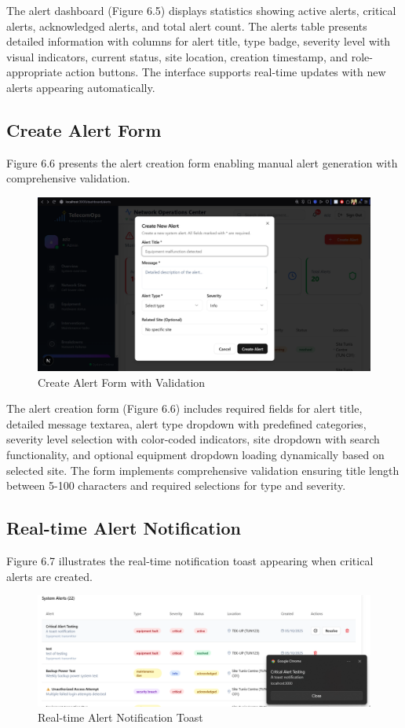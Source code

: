 The alert dashboard (Figure 6.5) displays statistics showing active alerts, critical alerts, acknowledged alerts, and total alert count. The alerts table presents detailed information with columns for alert title, type badge, severity level with visual indicators, current status, site location, creation timestamp, and role-appropriate action buttons. The interface supports real-time updates with new alerts appearing automatically.

\subsection{Create Alert Form}

Figure 6.6 presents the alert creation form enabling manual alert generation with comprehensive validation.

\begin{figure}[H]
    \centering
    \includegraphics[width=0.7\linewidth]{img/chap_06/screenshot_create_alert.png}
    \caption{Create Alert Form with Validation}
    \label{fig:create_alert_form}
\end{figure}

The alert creation form (Figure 6.6) includes required fields for alert title, detailed message textarea, alert type dropdown with predefined categories, severity level selection with color-coded indicators, site dropdown with search functionality, and optional equipment dropdown loading dynamically based on selected site. The form implements comprehensive validation ensuring title length between 5-100 characters and required selections for type and severity.

\subsection{Real-time Alert Notification}

Figure 6.7 illustrates the real-time notification toast appearing when critical alerts are created.

\begin{figure}[H]
    \centering
    \includegraphics[width=1\linewidth]{img/chap_06/screenshot_alert_toast.png}
    \caption{Real-time Alert Notification Toast}
    \label{fig:alert_notification}
\end{figure}

